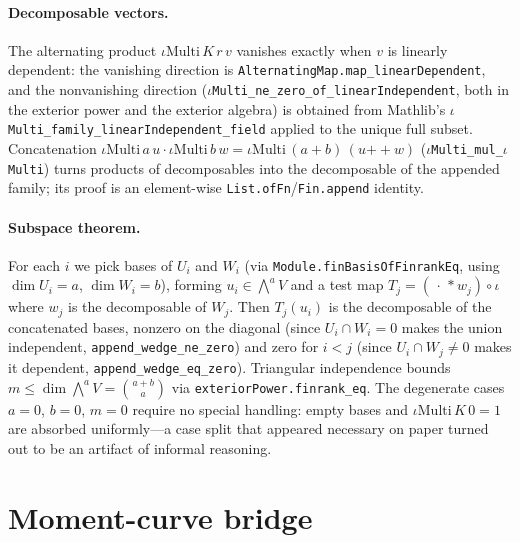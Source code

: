 \documentclass[11pt]{article}
\newcommand{\bind}[2]{\binom{#1}{#2}}
\newcommand{\wedgep}[1]{\textstyle\bigwedge^{#1}}
\begin{document}
\paragraph{Decomposable vectors.} The alternating product $\iota\mathrm{Multi}\,K\,r\,v$
vanishes exactly when $v$ is linearly dependent: the vanishing direction is
\lstinline{AlternatingMap.map_linearDependent}, and the nonvanishing direction
(\texttt{\(\iota\)Multi\_ne\_zero\_of\_linearIndependent}, both in the exterior power and the
exterior algebra) is obtained from Mathlib's
\texttt{\(\iota\)Multi\_family\_linearIndependent\_field} applied to the unique full subset.
Concatenation
$\iota\mathrm{Multi}\,a\,u\cdot\iota\mathrm{Multi}\,b\,w=\iota\mathrm{Multi}\,(a{+}b)\,(u\mathbin{+\!\!+}w)$
(\texttt{\(\iota\)Multi\_mul\_\(\iota\)Multi}) turns products of decomposables into the decomposable of
the appended family; its proof is an element-wise
\lstinline{List.ofFn}/\lstinline{Fin.append} identity.

\paragraph{Subspace theorem.} For each $i$ we pick bases of $U_i$ and $W_i$ (via
\lstinline{Module.finBasisOfFinrankEq}, using $\dim U_i=a$, $\dim W_i=b$), forming
$u_i\in\wedgep{a}V$ and a test map $T_j=(\,\cdot\,*w_j)\circ\iota$ where $w_j$ is the
decomposable of $W_j$. Then $T_j(u_i)$ is the decomposable of the concatenated bases,
nonzero on the diagonal (since $U_i\cap W_i=0$ makes the union independent,
\lstinline{append_wedge_ne_zero}) and zero for $i<j$ (since $U_i\cap W_j\neq0$ makes it
dependent, \lstinline{append_wedge_eq_zero}). Triangular independence bounds
$m\le\dim\wedgep{a}V=\bind{a+b}{a}$ via \lstinline{exteriorPower.finrank_eq}. The
degenerate cases $a=0$, $b=0$, $m=0$ require no special handling: empty bases and
$\iota\mathrm{Multi}\,K\,0=1$ are absorbed uniformly---a case split that appeared
necessary on paper turned out to be an artifact of informal reasoning.

\section{Moment-curve bridge}\label{sec:bridge}
\end{document}
